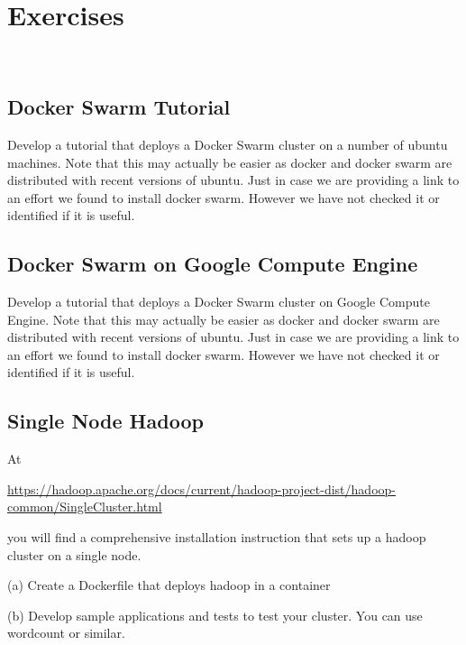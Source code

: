 

\chapter{Exercises}
\FILENAME\

\section{Docker Swarm Tutorial}

\begin{exercise}

  Develop a tutorial that deploys a Docker Swarm cluster on a number
  of ubuntu machines. Note that this may actually be easier as docker
  and docker swarm are distributed with recent versions of
  ubuntu. Just in case we are providing a link to an effort we found
  to install docker swarm. However we have not checked it or
  identified if it is useful.
 

\end{exercise}


\section{Docker Swarm on Google Compute Engine}

\begin{exercise}
  Develop a tutorial that deploys a Docker Swarm cluster on Google
  Compute Engine. Note that this may actually be easier as docker
  and docker swarm are distributed with recent versions of
  ubuntu. Just in case we are providing a link to an effort we found
  to install docker swarm. However we have not checked it or
  identified if it is useful.


\end{exercise}

\section{Single Node Hadoop}

\begin{exercise}

At

\url{https://hadoop.apache.org/docs/current/hadoop-project-dist/hadoop-common/SingleCluster.html}

you will find a comprehensive installation instruction that sets up a
hadoop cluster on a single node. 

(a) Create a Dockerfile that deploys hadoop in a container

(b) Develop sample applications and tests to test your cluster. You
can use wordcount or similar.

\end{exercise}


